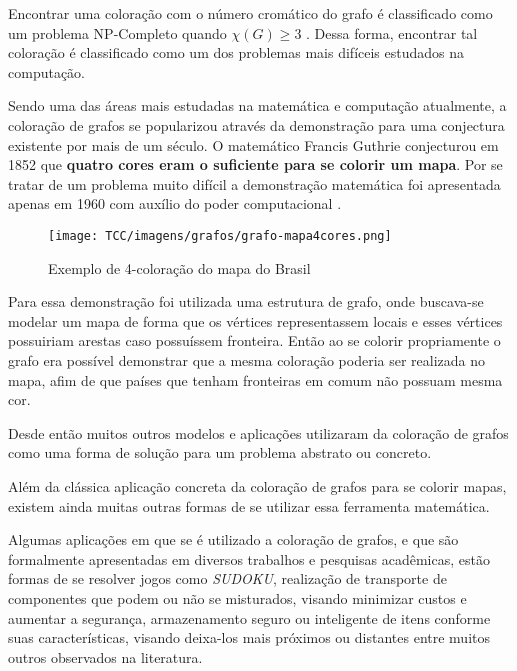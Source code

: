 Encontrar uma coloração com o número cromático do grafo é classificado como um problema NP-Completo quando $\chi(G) \geq 3$ . Dessa forma, encontrar tal coloração é classificado como um dos problemas mais difíceis estudados na computação.



Sendo uma das áreas mais estudadas na matemática e computação atualmente, a coloração de grafos se popularizou através da demonstração para uma conjectura existente por mais de um século. O matemático Francis Guthrie conjecturou em 1852 que \textbf{quatro cores eram o suficiente para se colorir um mapa}. Por se tratar de um problema muito difícil a demonstração matemática foi apresentada apenas em 1960 com auxílio do poder computacional \cite{lima_14}.

\begin{figure}[H]
     \centering
     \texttt{[image: TCC/imagens/grafos/grafo-mapa4cores.png]}
     \caption{Exemplo de 4-coloração do mapa do Brasil}
     \label{grafo-mapa4cores}
\end{figure}

Para essa demonstração foi utilizada uma estrutura de grafo, onde buscava-se modelar um mapa de forma que os vértices representassem locais e esses vértices possuiriam arestas caso possuíssem fronteira. Então ao se colorir propriamente o grafo era possível demonstrar que a mesma coloração poderia ser realizada no mapa, afim de que países que tenham fronteiras em comum não possuam mesma cor.



Desde então muitos outros modelos e aplicações utilizaram da coloração de grafos como uma forma de solução para um problema abstrato ou concreto.

Além da clássica aplicação concreta da coloração de grafos para se colorir mapas, existem ainda muitas outras formas de se utilizar essa ferramenta matemática.

Algumas aplicações em que se é utilizado a coloração de grafos, e que são formalmente apresentadas em diversos trabalhos e pesquisas acadêmicas, estão formas de se resolver jogos como \textit{SUDOKU}, realização de transporte de componentes que podem ou não se misturados, visando minimizar custos e aumentar a segurança, armazenamento seguro ou inteligente de itens conforme suas características, visando deixa-los mais próximos ou distantes entre muitos outros observados na literatura. 

